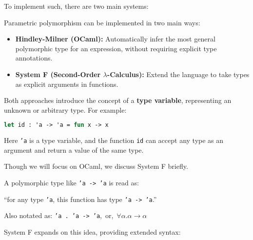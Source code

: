     \noindent
    To implement such, there are two main systems:
    \begin{Def}

        Parametric polymorphism can be implemented in two main ways:
        \begin{itemize}
            \item \textbf{Hindley-Milner (OCaml):} Automatically infer the most general polymorphic type for an expression, without requiring explicit type annotations.
            \item \textbf{System F (Second-Order $\lambda$-Calculus):} Extend the language to take types as explicit arguments in functions.
        \end{itemize}
        Both approaches introduce the concept of a \textbf{type variable}, representing an unknown or arbitrary type.
        For example:
        \begin{lstlisting}[language=OCaml, numbers=none]
    let id : 'a -> 'a = fun x -> x
        \end{lstlisting}

        \noindent
        Here \texttt{'a} is a type variable, and the function \texttt{id} can accept any type as an argument and return a value of the same type.
    \end{Def}

    \noindent
    Though we will focus on OCaml, we discuss System F briefly.

    \newpage 
    \noindent
    
    \begin{Def}[Quantification]

        A polymorphic type like \texttt{'a -> 'a} is read as: 
        \large
        \begin{center}
            ``for any type \texttt{'a}, this function has type \texttt{'a -> 'a}.'' 
        
        \end{center}
        \normalsize

        \noindent
        Also notated as: \texttt{'a . 'a -> 'a},\ or,\ $\forall \alpha.\alpha \to \alpha$
    \end{Def}

    \noindent
    System F expands on this idea, providing extended syntax:
        
